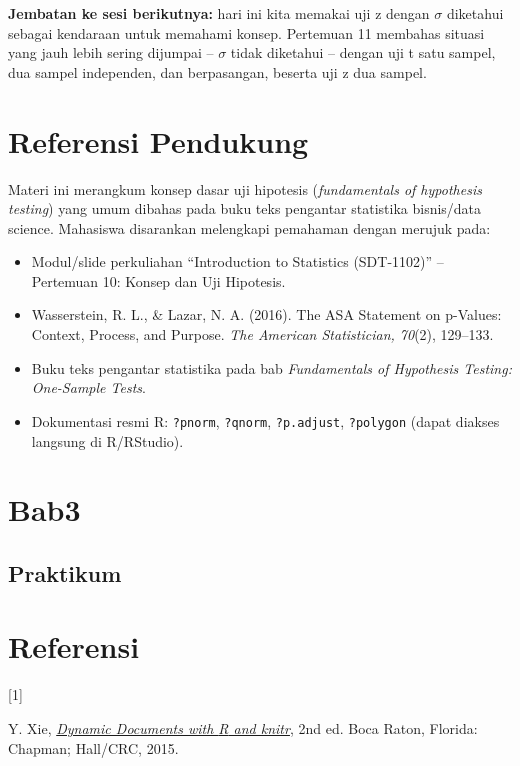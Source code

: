 \documentclass[
  indonesian,
  letterpaper,
]{book}
\newlength{\cslhangindent}
\newlength{\csllabelwidth}
\newenvironment{CSLReferences}[2] %
 {\begin{list}{}{%
  \setlength{\itemindent}{0pt}
  \setlength{\leftmargin}{0pt}
  \setlength{\parsep}{0pt}
  \ifodd #1
   \setlength{\leftmargin}{\cslhangindent}
   \setlength{\itemindent}{-1\cslhangindent}
  \fi
  \setlength{\itemsep}{#2\baselineskip}}}
 {\end{list}}
\newcommand{\CSLLeftMargin}[1]{\parbox[t]{\csllabelwidth}{\strut#1\strut}}
\newcommand{\CSLRightInline}[1]{\parbox[t]{\linewidth - \csllabelwidth}{\strut#1\strut}}
\providecommand{\tightlist}{%
  \setlength{\itemsep}{0pt}\setlength{\parskip}{0pt}}
\begin{document}
\textbf{Jembatan ke sesi berikutnya:} hari ini kita memakai uji z dengan
\(\sigma\) diketahui sebagai kendaraan untuk memahami konsep. Pertemuan
11 membahas situasi yang jauh lebih sering dijumpai -- \(\sigma\) tidak
diketahui -- dengan uji t satu sampel, dua sampel independen, dan
berpasangan, beserta uji z dua sampel.


\chapter{Referensi Pendukung}\label{referensi-pendukung-1}

Materi ini merangkum konsep dasar uji hipotesis (\emph{fundamentals of
hypothesis testing}) yang umum dibahas pada buku teks pengantar
statistika bisnis/data science. Mahasiswa disarankan melengkapi
pemahaman dengan merujuk pada:

\begin{itemize}
\tightlist
\item
  Modul/slide perkuliahan ``Introduction to Statistics (SDT-1102)'' --
  Pertemuan 10: Konsep dan Uji Hipotesis.
\item
  Wasserstein, R. L., \& Lazar, N. A. (2016). The ASA Statement on
  p-Values: Context, Process, and Purpose. \emph{The American
  Statistician, 70}(2), 129--133.
\item
  Buku teks pengantar statistika pada bab \emph{Fundamentals of
  Hypothesis Testing: One-Sample Tests}.
\item
  Dokumentasi resmi R: \texttt{?pnorm}, \texttt{?qnorm},
  \texttt{?p.adjust}, \texttt{?polygon} (dapat diakses langsung di
  R/RStudio).
\end{itemize}


\chapter{Bab3}\label{bab3}

\section{Praktikum}\label{praktikum}


\chapter*{Referensi}\label{referensi}


\protect{}\label{refs}
\begin{CSLReferences}{0}{0}
\CSLLeftMargin{{[}1{]} }%
\CSLRightInline{Y. Xie, \emph{\href{http://yihui.name/knitr/}{Dynamic
Documents with {R} and knitr}}, 2nd ed. Boca Raton, Florida: Chapman;
Hall/CRC, 2015.}

\end{CSLReferences}


\backmatter
\end{document}
